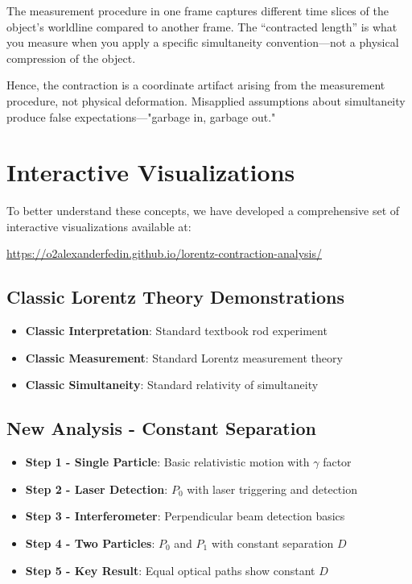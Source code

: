 \documentclass[11pt]{article}
\begin{document}
The measurement procedure in one frame captures different time slices of the object's worldline compared to another frame. The ``contracted length'' is what you measure when you apply a specific simultaneity convention—not a physical compression of the object.

Hence, the contraction is a coordinate artifact arising from the measurement procedure, not physical deformation. Misapplied assumptions about simultaneity produce false expectations—"garbage in, garbage out."

\section{Interactive Visualizations}

To better understand these concepts, we have developed a comprehensive set of interactive visualizations available at:

\begin{center}
\url{https://o2alexanderfedin.github.io/lorentz-contraction-analysis/}
\end{center}

\subsection{Classic Lorentz Theory Demonstrations}
\begin{itemize}
    \item \textbf{Classic Interpretation}: Standard textbook rod experiment
    \item \textbf{Classic Measurement}: Standard Lorentz measurement theory
    \item \textbf{Classic Simultaneity}: Standard relativity of simultaneity
\end{itemize}

\subsection{New Analysis - Constant Separation}
\begin{itemize}
    \item \textbf{Step 1 - Single Particle}: Basic relativistic motion with $\gamma$ factor
    \item \textbf{Step 2 - Laser Detection}: $P_0$ with laser triggering and detection
    \item \textbf{Step 3 - Interferometer}: Perpendicular beam detection basics
    \item \textbf{Step 4 - Two Particles}: $P_0$ and $P_1$ with constant separation $D$
    \item \textbf{Step 5 - Key Result}: Equal optical paths show constant $D$
\end{itemize}
\end{document}
